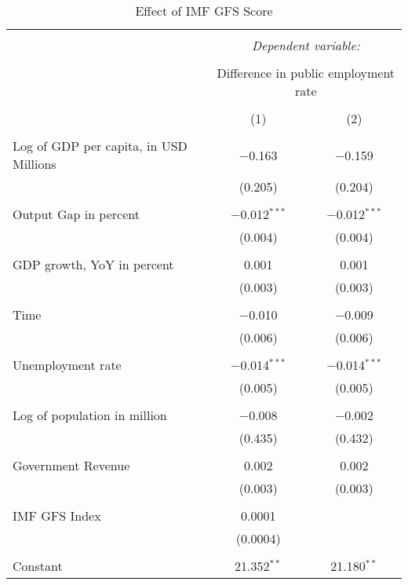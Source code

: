 
\begin{table}[!htbp] \centering 
  \caption{Effect of IMF GFS Score} 
  \label{} 
\begin{tabular}{@{\extracolsep{5pt}}lcc} 
\\[-1.8ex]\hline 
\hline \\[-1.8ex] 
 & \multicolumn{2}{c}{\textit{Dependent variable:}} \\ 
\cline{2-3} 
\\[-1.8ex] & \multicolumn{2}{c}{Difference in public employment rate} \\ 
\\[-1.8ex] & (1) & (2)\\ 
\hline \\[-1.8ex] 
 Log of GDP per capita, in USD Millions & $-$0.163 & $-$0.159 \\ 
  & (0.205) & (0.204) \\ 
  & & \\ 
 Output Gap in percent & $-$0.012$^{***}$ & $-$0.012$^{***}$ \\ 
  & (0.004) & (0.004) \\ 
  & & \\ 
 GDP growth, YoY in percent & 0.001 & 0.001 \\ 
  & (0.003) & (0.003) \\ 
  & & \\ 
 Time & $-$0.010 & $-$0.009 \\ 
  & (0.006) & (0.006) \\ 
  & & \\ 
 Unemployment rate & $-$0.014$^{***}$ & $-$0.014$^{***}$ \\ 
  & (0.005) & (0.005) \\ 
  & & \\ 
 Log of population in million & $-$0.008 & $-$0.002 \\ 
  & (0.435) & (0.432) \\ 
  & & \\ 
 Government Revenue & 0.002 & 0.002 \\ 
  & (0.003) & (0.003) \\ 
  & & \\ 
 IMF GFS Index & 0.0001 &  \\ 
  & (0.0004) &  \\ 
  & & \\ 
 Constant & 21.352$^{**}$ & 21.180$^{**}$ \\ 

\end{tabular}
\end{table}
